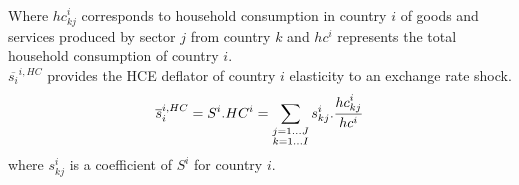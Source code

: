 \documentclass[12pt,a4paper]{paper}
\begin{document}
Where ${hc}_{kj}^i$ corresponds to household consumption in country $i$ of goods and services produced by sector $j$ from country $k$ and $hc^i$ represents the total household consumption of country $i$. \\
$\overline{s_{i}}^{i,HC}$ provides the HCE deflator of country $i$ elasticity to an exchange rate shock. 
 \begin{eqnarray}
\overline{s}_{i}^{i,HC}=S^i.HC^i=\underset{\begin{subarray}{c}j=1\dots J \\ k=1 \dots I \end{subarray}}{\mathop \sum}\,{{s}_{kj}^i}.\frac{{hc}_{kj}^i}{hc^i}
\label{eq:eq6}
 \end{eqnarray} 
where ${s}_{kj}^i$ is a coefficient of $S^i$ for country $i$. 
\end{document}

